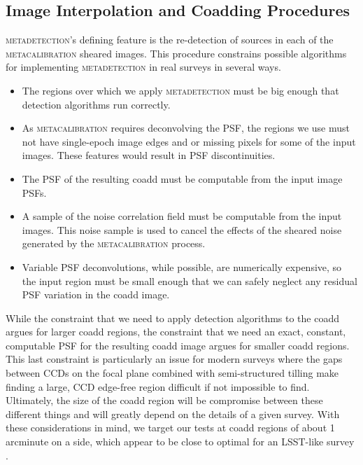 \documentclass[twocolappendix, appendixfloats, numberedappendix, twocolumn, apj]{openjournal}
\newcommand{\mdet}{\textsc{metadetection}\xspace}
\newcommand{\mcal}{\textsc{metacalibration}\xspace}
\begin{document}
\subsection{Image Interpolation and Coadding Procedures}\label{sec:coadd}

\mdet's defining feature is the re-detection of sources in each of the \mcal
sheared images. This procedure constrains possible algorithms for implementing
\mdet in real surveys in several ways.

\begin{itemize}
  \item The regions over which we apply \mdet
  must be big enough that detection algorithms run correctly.
  \item As \mcal requires deconvolving the PSF, the regions we use must not have
  single-epoch image edges and or missing pixels for some of the input images. These features
  would result in PSF discontinuities.
  \item The PSF of the resulting coadd must be computable from the input image PSFs.
  \item A sample of the noise correlation field must be computable from the input images.
  This noise sample is used to cancel the effects of the sheared noise generated
  by the \mcal process.
  \item Variable PSF deconvolutions, while possible, are numerically expensive, so the input
  region must be small enough that we can safely neglect any residual PSF variation in the coadd image.
\end{itemize}

While the constraint that we need to apply detection algorithms to the coadd argues
for larger coadd regions, the constraint that we need an exact, constant, computable
PSF for the resulting coadd image argues for smaller coadd regions. This last constraint is
particularly an issue for modern surveys where the gaps between CCDs on the focal plane
combined with semi-structured tilling make finding a large, CCD edge-free region difficult
if not impossible to find. Ultimately, the size of the coadd region will be compromise
between these different things and will greatly depend on the details of a given survey.
With these considerations in mind, we target our tests at coadd regions of about 1 arcminute
on a side, which appear to be close to optimal for an LSST-like survey \citep{ArmstrongCoadd}.
\end{document}
